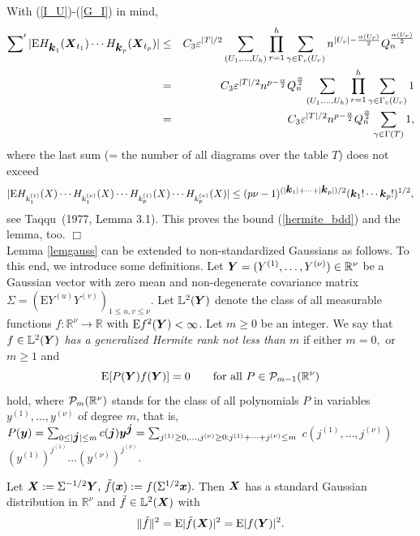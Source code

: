 \documentclass[10pt]{article}
\def\L{\mathbb{L}}
\def\R{\mathbb{R}}
\def\E{\mathrm E}
\def\text{\mbox}
\newcommand{\mbf}[1]{\mbox{\boldmath $#1$}}
\begin{document}
With (\ref{I_U})-(\ref{G_I}) in mind,
\begin{eqnarray*}
\sum\nolimits^\prime |\E H_{{\mbf k}_1}({\mbf X}_{t_1}) \cdots
H_{{\mbf k}_p}({\mbf X}_{t_p})| &\le&
C_3 \varepsilon^{|T|/2} \sum_{(U_1, \dots, U_h)} \prod_{r=1}^h
\sum_{\gamma \in \Gamma_c(U_r)} n^{|U_r| - \frac{\alpha (U_r)}{2}} Q_n^{\frac{\alpha (U_r)}{2}}\\
&=& C_3 \varepsilon^{|T|/2}n^{p- \frac{\alpha}{2}}
Q_n^{\frac{\alpha}{2}}
\sum_{(U_1, \dots, U_h)} \prod_{r=1}^h \sum_{\gamma \in \Gamma_c(U_r)}1 \\
&=& C_3 \varepsilon^{|T|/2}n^{p- \frac{\alpha}{2}}
Q_n^{\frac{\alpha}{2}}  \sum_{\gamma \in \Gamma (T)}1,
\end{eqnarray*}
where the last sum (= the number of all diagrams over the table
$T$) does not exceed
$$
|\E H_{k^{(1)}_{1}}(X) \cdots H_{k^{(\nu)}_{1}}(X) \cdots
H_{k^{(1)}_{p}}(X) \cdots H_{k^{(\nu)}_{p}}(X)| \le (p\nu -1)^{(|{\mbf
k}_1|+\dots + |{\mbf k}_p|)/2} ({\mbf k}_1! \cdots {\mbf k}_p!)^{1/2},
$$
see  Taqqu~(1977, Lemma 3.1). This proves the bound
(\ref{hermite_bdd}) and the lemma, too.  \hfill $\Box$ \\


Lemma \ref{lemgauss} can be extended to non-standardized Gaussians as follows.  To this end, we introduce some
definitions. Let ${\mbf Y} = (Y^{(1)}, \dots, Y^{(\nu)}) \in \R^\nu $ be a Gaussian vector with zero mean and
non-degenerate covariance matrix $\Sigma = (\E Y^{(u)} Y^{(v)})_{1\le u,v \le \nu}$.
Let $\L^2 ({\mbf Y}) $ denote the class of all
measurable functions $f: \R^\nu \to \R$
with $%
\E f^2({\mbf Y}) <
\infty $. Let $m \ge 0$ be an integer.
We say that {\it  $f \in \L^2 ({\mbf Y})$ has a generalized Hermite rank not less than $m$} if either
$m = 0,$  or $m \ge 1 $ and
\begin{equation}\label{PG0}
\E [ P({\mbf Y}) f({\mbf Y}) ]  = 0 \qquad \text{for all} \  P \in {\cal P}_{m-1}({\R}^\nu)
\end{equation}
hold, where ${\cal P}_m({\R}^\nu)$ stands for  the class of all polynomials $P$ in variables $y^{(1)}, \dots, y^{(\nu)}$ of degree $m$,
that is,
$P({\mbf y}) = \sum_{0\le |{\mbf j}|\le m} c({\mbf j}) {\mbf y}^{\mbf j}
= \sum_{j^{(1)} \ge 0, \dots, j^{(\nu)} \ge 0: j^{(1)} + \dots + j^{(\nu)} \le m} $  $ c(j^{(1)}, \dots, j^{(\nu)}) $
$(y^{(1)})^{j^{(1)}} \dots (y^{(\nu)})^{j^{(\nu)}} $.

Let ${\mbf
X} :=  \Sigma^{-1/2} {\mbf
Y}, \,   \tilde f({\mbf x}) := f( \Sigma^{1/2} {\mbf x}).    $ Then   ${\mbf
X}$ has a standard Gaussian distribution in $\R^\nu$ and $\tilde f \in \L^2 ({\mbf X})$
with
\begin{equation}\label{PG2}
\|\tilde f \|^2 =  \E|\tilde f({\mbf X})|^2 =  \E|f ({\mbf Y})|^2.
\end{equation}
\end{document}
